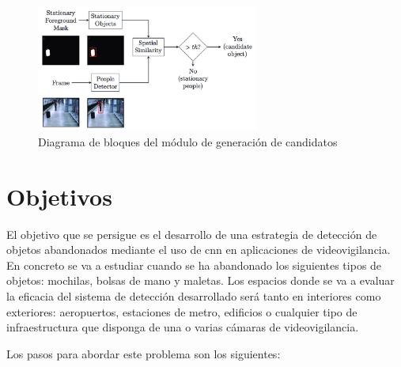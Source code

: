\begin{figure}[ht]
\centering
\includegraphics[width=0.65\textwidth]{img/chapters/introduccion/Block-diagram-Stationary-detection.png}
\caption{\label{fig:diagram-stationary-detection}Diagrama de bloques del módulo de generación de candidatos \cite{luna2018}}
\end{figure}

\section{Objetivos}
\label{sec:objetivos}

El objetivo que se persigue es el desarrollo de una estrategia de detección de objetos abandonados mediante el uso de \gls{cnn} en aplicaciones de videovigilancia. En concreto se va a estudiar cuando se ha abandonado los siguientes tipos de objetos: mochilas, bolsas de mano y maletas. Los espacios donde se va a evaluar la eficacia del sistema de detección desarrollado será tanto en interiores como exteriores: aeropuertos, estaciones de metro, edificios o cualquier tipo de infraestructura que disponga de una o varias cámaras de videovigilancia.

Los pasos para abordar este problema son los siguientes:

